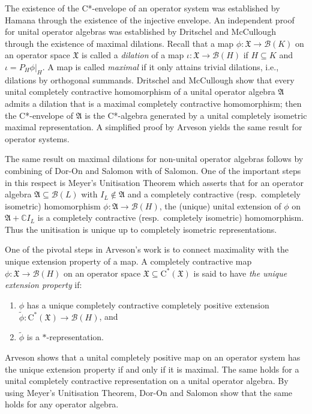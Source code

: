 \documentclass[11pt, draft]{amsart}
\numberwithin{equation}{section}
\theoremstyle{plain}
\theoremstyle{definition}
\theoremstyle{remark}
\newcommand{\B}{{\mathcal{B}}}
\def\io{\iota}
\newcommand{\bC}{\mathbb{C}}
\newcommand{\fA}{{\mathfrak{A}}}
\newcommand{\fX}{{\mathfrak{X}}}
\newcommand{\ca}{\mathrm{C}^*}
\newcommand{\wt}{\widetilde}
\begin{document}
The existence of the C*-envelope of an operator system was established by Hamana \cite{Ham79} through the existence of the injective envelope.
An independent proof for unital operator algebras was established by Dritschel and McCullough \cite{DM05} through the existence of maximal dilations.
Recall that a map $\phi \colon \fX \to \B(K)$ on an operator space $\fX$ is called a \emph{dilation} of a map $\io \colon \fX \to \B(H)$ if $H \subseteq K$ and $\io = P_H \phi|_H$.
A map is called \emph{maximal} if it only attains trivial dilations, i.e., dilations by orthogonal summands.
Dritschel and McCullough \cite{DM05} show that every unital completely contractive homomorphism of a unital operator algebra $\fA$ admits a dilation that is a maximal completely contractive homomorphism; then the C*-envelope of $\fA$ is the C*-algebra generated by a unital completely isometric maximal representation.
A simplified proof by Arveson \cite{Arv08} yields the same result for operator systems. 

The same result on maximal dilations for non-unital operator algebras follows by combining \cite[Proposition 2.4]{DS18} of Dor-On and Salomon with \cite[Proposition 4.8]{Sal17} of Salomon.
One of the important steps in this respect is Meyer's Unitisation Theorem which asserts that for an operator algebra $\fA \subseteq \B(L)$ with $I_L \notin \fA$ and a completely contractive (resp.\ completely isometric) homomorphism $\phi \colon \fA \to \B(H)$, the (unique) unital extension of $\phi$ on $\fA +\bC I_L$ is a completely contractive (resp.\ completely isometric) homomorphism.
Thus the unitisation is unique up to completely isometric representations.

One of the pivotal steps in Arveson's work \cite{Arv08} is to connect maximality with the unique extension property of a map.
A completely contractive map $\phi \colon \fX \to \B(H)$ on an operator space $\fX \subseteq \ca(\fX)$ is said to have \emph{the unique extension property} if:
\begin{enumerate}
\item $\phi$ has a unique completely contractive completely positive extension $\wt{\phi} \colon \ca(\fX) \to \B(H)$, and
\item $\wt{\phi}$ is a $*$-representation.
\end{enumerate}
Arveson \cite{Arv08} shows that a unital completely positive map on an operator system has the unique extension property if and only if it is maximal.
The same holds for a unital completely contractive representation on a unital operator algebra.
By using Meyer's Unitisation Theorem, Dor-On and Salomon \cite{DS18} show that the same holds for any operator algebra.
\end{document}
